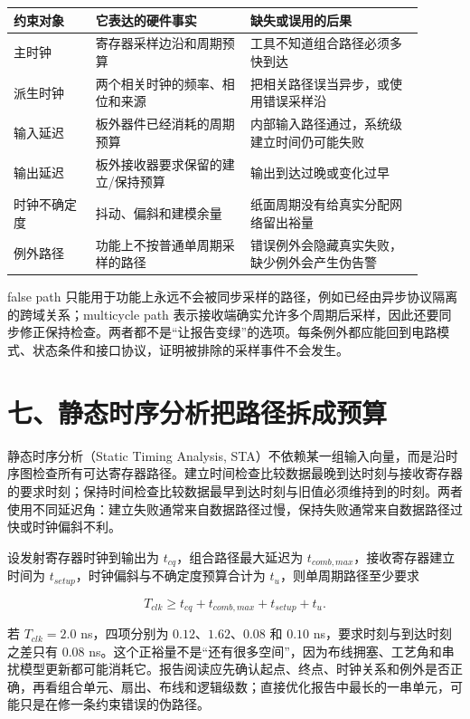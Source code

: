 \begin{longtable}{L{0.18\linewidth}L{0.34\linewidth}L{0.38\linewidth}}
\toprule
约束对象 & 它表达的硬件事实 & 缺失或误用的后果 \\
\midrule
主时钟 & 寄存器采样边沿和周期预算 & 工具不知道组合路径必须多快到达 \\\tablerowrule
派生时钟 & 两个相关时钟的频率、相位和来源 & 把相关路径误当异步，或使用错误采样沿 \\\tablerowrule
输入延迟 & 板外器件已经消耗的周期预算 & 内部输入路径通过，系统级建立时间仍可能失败 \\\tablerowrule
输出延迟 & 板外接收器要求保留的建立/保持预算 & 输出到达过晚或变化过早 \\\tablerowrule
时钟不确定度 & 抖动、偏斜和建模余量 & 纸面周期没有给真实分配网络留出裕量 \\\tablerowrule
例外路径 & 功能上不按普通单周期采样的路径 & 错误例外会隐藏真实失败，缺少例外会产生伪告警 \\
\bottomrule
\end{longtable}

false path 只能用于功能上永远不会被同步采样的路径，例如已经由异步协议隔离的跨域关系；multicycle path 表示接收端确实允许多个周期后采样，因此还要同步修正保持检查。两者都不是“让报告变绿”的选项。每条例外都应能回到电路模式、状态条件和接口协议，证明被排除的采样事件不会发生。

\section{七、静态时序分析把路径拆成预算}

静态时序分析（Static Timing Analysis, STA）不依赖某一组输入向量，而是沿时序图检查所有可达寄存器路径。建立时间检查比较数据最晚到达时刻与接收寄存器的要求时刻；保持时间检查比较数据最早到达时刻与旧值必须维持到的时刻。两者使用不同延迟角：建立失败通常来自数据路径过慢，保持失败通常来自数据路径过快或时钟偏斜不利。

设发射寄存器时钟到输出为 $t_{cq}$，组合路径最大延迟为 $t_{comb,max}$，接收寄存器建立时间为 $t_{setup}$，时钟偏斜与不确定度预算合计为 $t_u$，则单周期路径至少要求

\[
T_{clk} \ge t_{cq}+t_{comb,max}+t_{setup}+t_u.
\]

若 $T_{clk}=2.0$ ns，四项分别为 $0.12$、$1.62$、$0.08$ 和 $0.10$ ns，要求时刻与到达时刻之差只有 $0.08$ ns。这个正裕量不是“还有很多空间”，因为布线拥塞、工艺角和串扰模型更新都可能消耗它。报告阅读应先确认起点、终点、时钟关系和例外是否正确，再看组合单元、扇出、布线和逻辑级数；直接优化报告中最长的一串单元，可能只是在修一条约束错误的伪路径。

